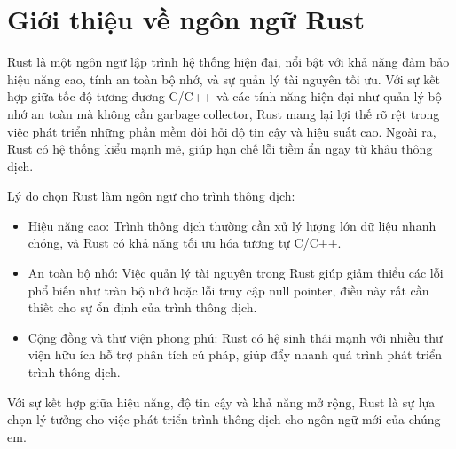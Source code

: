 \section{Giới thiệu về ngôn ngữ Rust}
Rust là một ngôn ngữ lập trình hệ thống hiện đại, nổi bật với khả năng đảm bảo hiệu năng cao, tính an toàn bộ nhớ, và sự quản lý tài nguyên tối ưu. Với sự kết hợp giữa tốc độ tương đương C/C++ và các tính năng hiện đại như quản lý bộ nhớ an toàn mà không cần garbage collector, Rust mang lại lợi thế rõ rệt trong việc phát triển những phần mềm đòi hỏi độ tin cậy và hiệu suất cao. Ngoài ra, Rust có hệ thống kiểu mạnh mẽ, giúp hạn chế lỗi tiềm ẩn ngay từ khâu thông dịch. 

Lý do chọn Rust làm ngôn ngữ cho trình thông dịch:

\begin{itemize}
\item Hiệu năng cao: Trình thông dịch thường cần xử lý lượng lớn dữ liệu nhanh chóng, và Rust có khả năng tối ưu hóa tương tự C/C++. 
\item An toàn bộ nhớ: Việc quản lý tài nguyên trong Rust giúp giảm thiểu các lỗi phổ biến như tràn bộ nhớ hoặc lỗi truy cập null pointer, điều này rất cần thiết cho sự ổn định của trình thông dịch. 
\item Cộng đồng và thư viện phong phú: Rust có hệ sinh thái mạnh với nhiều thư viện hữu ích hỗ trợ phân tích cú pháp, giúp đẩy nhanh quá trình phát triển trình thông dịch.      
\end{itemize}

Với sự kết hợp giữa hiệu năng, độ tin cậy và khả năng mở rộng, Rust là sự lựa chọn lý tưởng cho việc phát triển trình thông dịch cho ngôn ngữ mới của chúng em. 
